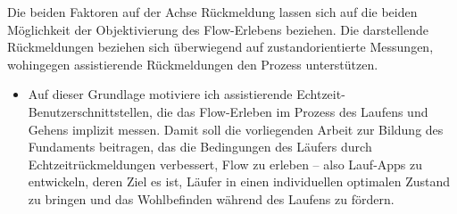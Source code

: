 Die beiden Faktoren auf der Achse Rückmeldung lassen sich auf die beiden Möglichkeit der Objektivierung des Flow-Erlebens beziehen. Die darstellende Rückmeldungen beziehen sich überwiegend auf zustandorientierte Messungen, wohingegen assistierende Rückmeldungen den Prozess unterstützen. 
\begin{itemize}
	
	\item Auf dieser Grundlage motiviere ich assistierende Echtzeit-Benutzerschnittstellen, die das Flow-Erleben im Prozess des Laufens und Gehens implizit messen. Damit soll die vorliegenden Arbeit zur Bildung des Fundaments beitragen, das die Bedingungen des Läufers durch Echtzeitrückmeldungen verbessert, Flow zu erleben -- also Lauf-Apps zu entwickeln, deren Ziel es ist, Läufer in einen individuellen optimalen Zustand zu bringen und das Wohlbefinden während des Laufens zu fördern. 
\end{itemize}

